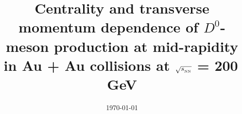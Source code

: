 \documentclass[%
 reprint,	
 amsmath,amssymb,
 aps,
 prc,
]{revtex4-1}
\begin{document}

\title{Centrality and transverse momentum dependence of $D^0$-meson production at mid-rapidity in Au + Au collisions at $\sqrt{s_{_{\rm NN}}}$ = 200\,GeV}%


\noaffiliation

\date{\today}%
\end{document}
